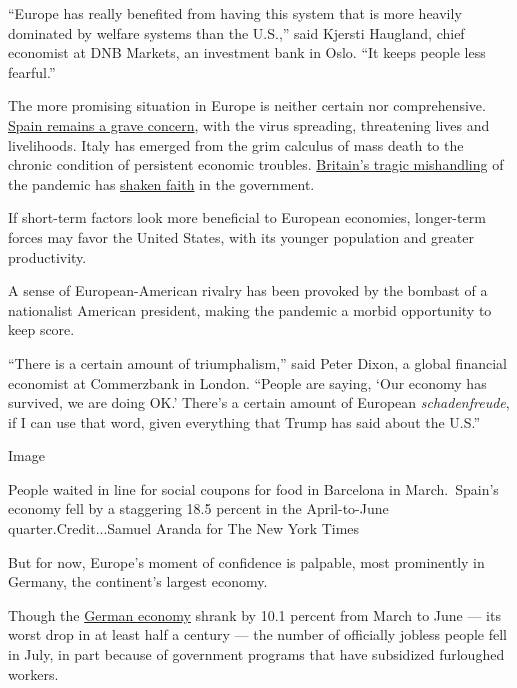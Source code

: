 ``Europe has really benefited from having this system that is more
heavily dominated by welfare systems than the U.S.,'' said Kjersti
Haugland, chief economist at DNB Markets, an investment bank in Oslo.
``It keeps people less fearful.''

The more promising situation in Europe is neither certain nor
comprehensive.
\href{https://www.nytimes.com/2020/07/23/world/europe/spain-coronavirus-reopening.html}{Spain
remains a grave concern}, with the virus spreading, threatening lives
and livelihoods. Italy has emerged from the grim calculus of mass death
to the chronic condition of persistent economic troubles.
\href{https://www.nytimes.com/2020/07/30/world/europe/UK-deaths-coronavirus-europe.html}{Britain's
tragic mishandling} of the pandemic has
\href{https://www.reuters.com/article/us-health-coronavirus-poll/uk-leads-fall-in-global-trust-in-government-covid-responses-poll-idUSKBN23B0H4}{shaken
faith} in the government.

If short-term factors look more beneficial to European economies,
longer-term forces may favor the United States, with its younger
population and greater productivity.

A sense of European-American rivalry has been provoked by the bombast of
a nationalist American president, making the pandemic a morbid
opportunity to keep score.

``There is a certain amount of triumphalism,'' said Peter Dixon, a
global financial economist at Commerzbank in London. ``People are
saying, `Our economy has survived, we are doing OK.' There's a certain
amount of European \emph{schadenfreude}, if I can use that word, given
everything that Trump has said about the U.S.''

Image

People waited in line for social coupons for food in Barcelona in
March.~Spain's economy fell by a staggering 18.5 percent in the
April-to-June quarter.Credit...Samuel Aranda for The New York Times

But for now, Europe's moment of confidence is palpable, most prominently
in Germany, the continent's largest economy.

Though the
\href{https://www.nytimes.com/2020/07/30/business/the-german-economy-had-its-biggest-slump-in-50-years.html}{German
economy} shrank by 10.1 percent from March to June --- its worst drop in
at least half a century --- the number of officially jobless people fell
in July, in part because of government programs that have subsidized
furloughed workers.

